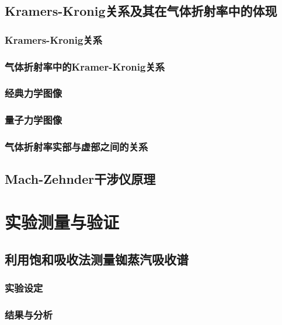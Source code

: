 \documentclass[a4paper, 10pt]{article}
\begin{document}
\begin{multicols}{2}
\subsection{Kramers-Kronig关系及其在气体折射率中的体现}

\subsubsection{Kramers-Kronig关系}

\subsubsection{气体折射率中的Kramer-Kronig关系}

\subsubsection{经典力学图像}

\subsubsection{量子力学图像}

\subsubsection{气体折射率实部与虚部之间的关系}

\subsection{Mach-Zehnder干涉仪原理}

\section{实验测量与验证}

\subsection{利用饱和吸收法测量铷蒸汽吸收谱}

\subsubsection{实验设定}

\subsubsection{结果与分析}


\end{multicols}
\end{document}

